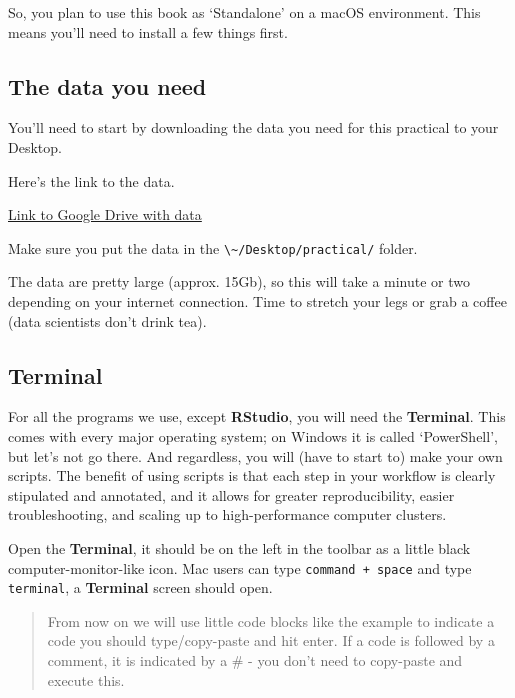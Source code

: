 \documentclass[
]{book}
\newcommand{\passthrough}[1]{#1}
\begin{document}
So, you plan to use this book as `Standalone' on a macOS environment. This means you'll need to install a few things first.

\hypertarget{the-data-you-need}{%
\subsection{The data you need}\label{the-data-you-need}}

You'll need to start by downloading the data you need for this practical to your Desktop.

Here's the link to the data.

\href{https://drive.google.com/drive/folders/1iDLB1y534DfgEZNPCYBrIj5X7g_XlBba?usp=share_link}{Link to Google Drive with data}

Make sure you put the data in the \passthrough{\lstinline!\~/Desktop/practical/!} folder.

The data are pretty large (approx. 15Gb), so this will take a minute or two depending on your internet connection. Time to stretch your legs or grab a coffee (data scientists don't drink tea).

\hypertarget{terminal}{%
\subsection{Terminal}\label{terminal}}

For all the programs we use, except \textbf{RStudio}, you will need the \textbf{Terminal}. This comes with every major operating system; on Windows it is called `PowerShell', but let's not go there. And regardless, you will (have to start to) make your own scripts. The benefit of using scripts is that each step in your workflow is clearly stipulated and annotated, and it allows for greater reproducibility, easier troubleshooting, and scaling up to high-performance computer clusters.

Open the \textbf{Terminal}, it should be on the left in the toolbar as a little black computer-monitor-like icon. Mac users can type \passthrough{\lstinline!command + space!} and type \passthrough{\lstinline!terminal!}, a \textbf{Terminal} screen should open.

\begin{quote}
From now on we will use little code blocks like the example to indicate a code you should type/copy-paste and hit enter. If a code is followed by a comment, it is indicated by a \# - you don't need to copy-paste and execute this.
\end{quote}
\end{document}

